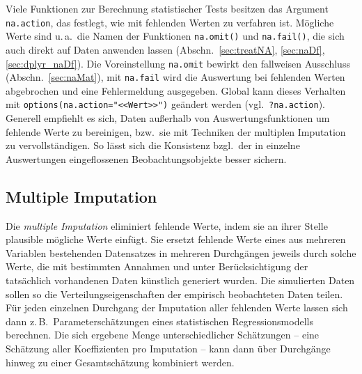 Viele Funktionen zur Berechnung statistischer Tests besitzen das Argument \lstinline!na.action!, das festlegt, wie mit fehlenden Werten zu verfahren ist. Mögliche Werte sind u.\,a.\ die Namen der Funktionen \lstinline!na.omit()! und \lstinline!na.fail()!, die sich auch direkt auf Daten anwenden lassen (Abschn.\ \ref{sec:treatNA}, \ref{sec:naDf}, \ref{sec:dplyr_naDf}). Die Voreinstellung \lstinline!na.omit! bewirkt den fallweisen Ausschluss (Abschn.\ \ref{sec:naMat}), mit \lstinline!na.fail! wird die Auswertung bei fehlenden Werten abgebrochen und eine Fehlermeldung ausgegeben. Global kann dieses Verhalten mit \lstinline!options(na.action="<<Wert>>")! geändert werden (vgl.\ \lstinline!?na.action!). Generell empfiehlt es sich, Daten außerhalb von Auswertungsfunktionen um fehlende Werte zu bereinigen, bzw.\ sie mit Techniken der multiplen Imputation zu vervollständigen. So lässt sich die Konsistenz bzgl.\ der in einzelne Auswertungen eingeflossenen Beobachtungsobjekte besser sichern.

\subsection{Multiple Imputation}
\label{sec:multipleImputation}

Die \emph{multiple Imputation} eliminiert fehlende Werte, indem sie an ihrer Stelle plausible mögliche Werte einfügt. Sie ersetzt fehlende Werte eines aus mehreren Variablen bestehenden Datensatzes in mehreren Durchgängen jeweils durch solche Werte, die mit bestimmten Annahmen und unter Berücksichtigung der tatsächlich vorhandenen Daten künstlich generiert wurden. Die simulierten Daten sollen so die Verteilungseigenschaften der empirisch beobachteten Daten teilen. Für jeden einzelnen Durchgang der Imputation aller fehlenden Werte lassen sich dann z.\,B.\ Parameterschätzungen eines statistischen Regressionsmodells berechnen. Die sich ergebene Menge unterschiedlicher Schätzungen -- eine Schätzung aller Koeffizienten pro Imputation -- kann dann über Durchgänge hinweg zu einer Gesamtschätzung kombiniert werden.


